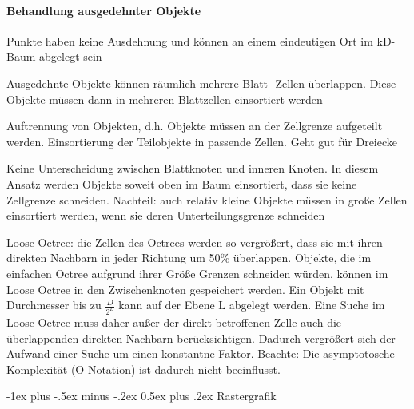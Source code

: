 \documentclass[landscape]{article}
\makeatletter
\renewcommand{\section}{\@startsection{section}{1}{0mm}%
                                {-1ex plus -.5ex minus -.2ex}%
                                {0.5ex plus .2ex}%
                                {\normalfont\large\bfseries}}
\makeatother
\begin{document}
\begin{multicols}{3}
  \paragraph{Behandlung ausgedehnter Objekte}
  \begin{itemize*}
    \item Punkte haben keine Ausdehnung und können an einem eindeutigen Ort im kD-Baum abgelegt sein
    \item Ausgedehnte Objekte können räumlich mehrere Blatt- Zellen überlappen. Diese Objekte müssen dann in mehreren Blattzellen einsortiert werden
  \end{itemize*}
  \begin{enumerate*}
    \item Auftrennung von Objekten, d.h. Objekte müssen an der Zellgrenze aufgeteilt werden. Einsortierung der Teilobjekte in passende Zellen. Geht gut für Dreiecke
    \item Keine Unterscheidung zwischen Blattknoten und inneren Knoten. In diesem Ansatz werden Objekte soweit oben im Baum einsortiert, dass sie keine Zellgrenze schneiden. Nachteil: auch relativ kleine Objekte müssen in große Zellen einsortiert werden, wenn sie deren Unterteilungsgrenze schneiden
    \item Loose Octree: die Zellen des Octrees werden so vergrößert, dass sie mit ihren direkten Nachbarn in jeder Richtung um 50\% überlappen. Objekte, die im einfachen Octree aufgrund ihrer Größe Grenzen schneiden würden, können im Loose Octree in den Zwischenknoten gespeichert werden. Ein Objekt mit Durchmesser bis zu $\frac{D}{2^L}$ kann auf der Ebene L abgelegt werden. Eine Suche im Loose Octree muss daher außer der direkt betroffenen Zelle auch die überlappenden direkten Nachbarn berücksichtigen. Dadurch vergrößert sich der Aufwand einer Suche um einen konstantne Faktor. Beachte: Die asymptotosche Komplexität (O-Notation) ist dadurch nicht beeinflusst.
  \end{enumerate*}
  
  \newpage
  \section{Rastergrafik}
  

\end{multicols}
\end{document}

